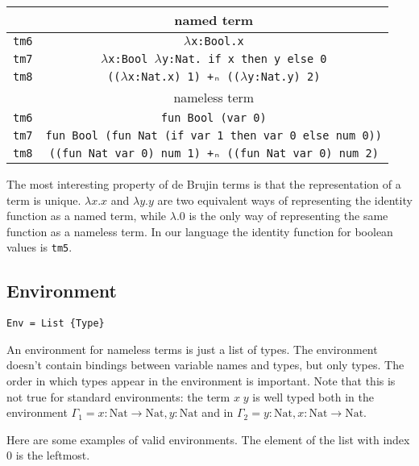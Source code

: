 \documentclass{article}
\begin{document}
\begin{center}
\begin{tabular}{ |c|c| } 
 \hline
 & named term \\
 \hline
 \texttt{tm6} & \texttt{$\lambda$x:Bool.x} \\
 \texttt{tm7} & \texttt{$\lambda$x:Bool $\lambda$y:Nat. if x then y else 0} \\
 \texttt{tm8} & \texttt{(($\lambda$x:Nat.x) 1) +ₙ (($\lambda$y:Nat.y) 2)} \\
 \hline
 \hline
 
 & nameless term \\
 \hline
 \texttt{tm6} & \texttt{fun Bool (var 0)} \\
 \texttt{tm7} & \texttt{fun Bool (fun Nat (if var 1 then var 0 else num 0))} \\
 \texttt{tm8} & \texttt{((fun Nat var 0) num 1) +ₙ ((fun Nat var 0) num 2)} \\
 
 \hline
\end{tabular}
\end{center}

The most interesting property of de Brujin terms is that the representation of a term is unique.
$\lambda x.x$ and $\lambda y.y$ are two equivalent ways of representing the identity function as a named term, while $\lambda.0$ is the only way of representing the same function as a nameless term.
In our language the identity function for boolean values is \texttt{tm5}.


\subsection*{Environment}

\begin{verbatim}
Env = List {Type}
\end{verbatim}

An environment for nameless terms is just a list of types.
The environment doesn't contain bindings between variable names and types, but only types.
The order in which types appear in the environment is important.
Note that this is not true for standard environments: the term $x \; y$ is well typed both in the environment $\Gamma_1 = x:\text{Nat} \to \text{Nat}, y:\text{Nat}$ and in $\Gamma_2 = y:\text{Nat}, x:\text{Nat} \to \text{Nat}$. 

Here are some examples of valid environments.
The element of the list with index 0 is the leftmost.
\end{document}
